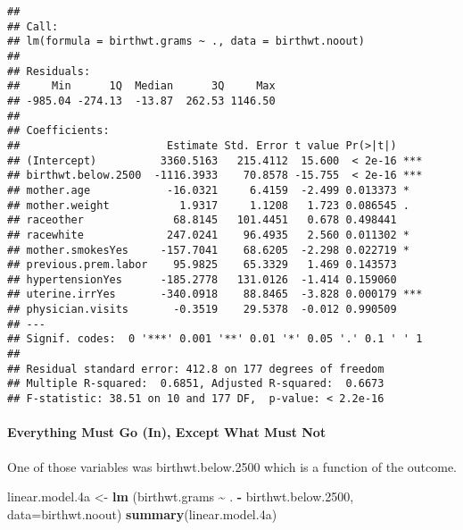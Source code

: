 \documentclass[
]{article}
\newenvironment{Shaded}{\begin{snugshade}}{\end{snugshade}}
\newcommand{\AttributeTok}[1]{\textcolor[rgb]{0.13,0.29,0.53}{#1}}
\newcommand{\FloatTok}[1]{\textcolor[rgb]{0.00,0.00,0.81}{#1}}
\newcommand{\FunctionTok}[1]{\textcolor[rgb]{0.13,0.29,0.53}{\textbf{#1}}}
\newcommand{\NormalTok}[1]{#1}
\newcommand{\OtherTok}[1]{\textcolor[rgb]{0.56,0.35,0.01}{#1}}
\newcommand{\SpecialCharTok}[1]{\textcolor[rgb]{0.81,0.36,0.00}{\textbf{#1}}}
\begin{document}
\begin{verbatim}
## 
## Call:
## lm(formula = birthwt.grams ~ ., data = birthwt.noout)
## 
## Residuals:
##     Min      1Q  Median      3Q     Max 
## -985.04 -274.13  -13.87  262.53 1146.50 
## 
## Coefficients:
##                       Estimate Std. Error t value Pr(>|t|)    
## (Intercept)          3360.5163   215.4112  15.600  < 2e-16 ***
## birthwt.below.2500  -1116.3933    70.8578 -15.755  < 2e-16 ***
## mother.age            -16.0321     6.4159  -2.499 0.013373 *  
## mother.weight           1.9317     1.1208   1.723 0.086545 .  
## raceother              68.8145   101.4451   0.678 0.498441    
## racewhite             247.0241    96.4935   2.560 0.011302 *  
## mother.smokesYes     -157.7041    68.6205  -2.298 0.022719 *  
## previous.prem.labor    95.9825    65.3329   1.469 0.143573    
## hypertensionYes      -185.2778   131.0126  -1.414 0.159060    
## uterine.irrYes       -340.0918    88.8465  -3.828 0.000179 ***
## physician.visits       -0.3519    29.5378  -0.012 0.990509    
## ---
## Signif. codes:  0 '***' 0.001 '**' 0.01 '*' 0.05 '.' 0.1 ' ' 1
## 
## Residual standard error: 412.8 on 177 degrees of freedom
## Multiple R-squared:  0.6851, Adjusted R-squared:  0.6673 
## F-statistic: 38.51 on 10 and 177 DF,  p-value: < 2.2e-16
\end{verbatim}

\paragraph{Everything Must Go (In), Except What Must
Not}\label{everything-must-go-in-except-what-must-not}

One of those variables was birthwt.below.2500 which is a function of the
outcome.

\begin{Shaded}
\begin{Highlighting}[]
\NormalTok{linear.model}\FloatTok{.4}\NormalTok{a }\OtherTok{\textless{}{-}} \FunctionTok{lm}\NormalTok{ (birthwt.grams }\SpecialCharTok{\textasciitilde{}}\NormalTok{ . }\SpecialCharTok{{-}}\NormalTok{ birthwt.below}\FloatTok{.2500}\NormalTok{, }\AttributeTok{data=}\NormalTok{birthwt.noout)}
\FunctionTok{summary}\NormalTok{(linear.model}\FloatTok{.4}\NormalTok{a)}
\end{Highlighting}
\end{Shaded}
\end{document}
